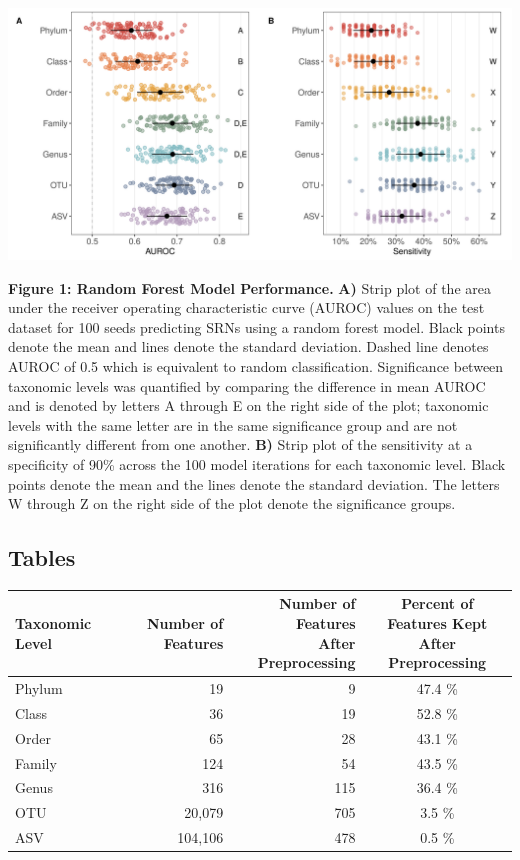 \documentclass[
]{article}
\begin{document}
\includegraphics{figure_1.png}

\textbf{Figure 1: Random Forest Model Performance.} \textbf{A)} Strip
plot of the area under the receiver operating characteristic curve
(AUROC) values on the test dataset for 100 seeds predicting SRNs using a
random forest model. Black points denote the mean and lines denote the
standard deviation. Dashed line denotes AUROC of 0.5 which is equivalent
to random classification. Significance between taxonomic levels was
quantified by comparing the difference in mean AUROC and is denoted by
letters A through E on the right side of the plot; taxonomic levels with
the same letter are in the same significance group and are not
significantly different from one another. \textbf{B)} Strip plot of the
sensitivity at a specificity of 90\% across the 100 model iterations for
each taxonomic level. Black points denote the mean and the lines denote
the standard deviation. The letters W through Z on the right side of the
plot denote the significance groups.

\newpage

\hypertarget{tables}{%
\subsection{Tables}\label{tables}}

\begin{longtable}[]{@{}lrrc@{}}
\toprule
Taxonomic Level & Number of Features &
\makecell[c]{Number of Features \\ After Preprocessing} &
\makecell[c]{Percent of Features Kept \\ After Preprocessing} \\
\midrule
\endhead
Phylum & 19 & 9 & 47.4 \% \\
Class & 36 & 19 & 52.8 \% \\
Order & 65 & 28 & 43.1 \% \\
Family & 124 & 54 & 43.5 \% \\
Genus & 316 & 115 & 36.4 \% \\
OTU & 20,079 & 705 & 3.5 \% \\
ASV & 104,106 & 478 & 0.5 \% \\
\bottomrule
\end{longtable}
\end{document}
